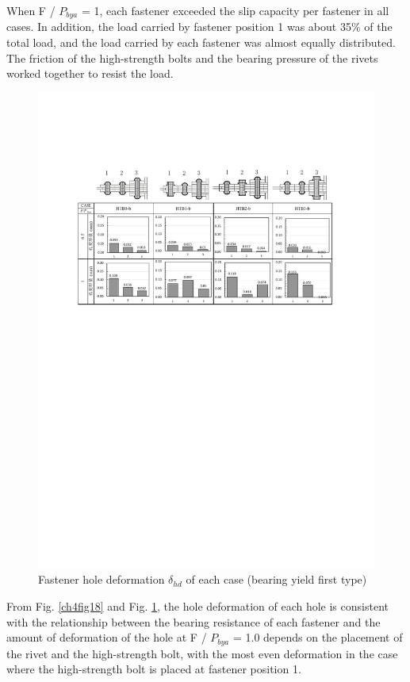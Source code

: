 When F / $P_{bya}$  = 1, each fastener exceeded the slip capacity per fastener in all cases. In addition, the load carried by fastener position 1 was about 35\% of the total load, and the load carried by each fastener was almost equally distributed. The friction of the high-strength bolts and the bearing pressure of the rivets worked together to resist the load.

\begin{figure}
    \centering
    \includegraphics[width=\textwidth]{imgs/ch4/fig19.pdf}
    \caption{Fastener hole deformation $\delta_{hd}$ of each case (bearing yield first type)}
    \label{ch4fig19}
\end{figure}

From Fig. \ref{ch4fig18} and Fig. \ref{ch4fig19}, the hole deformation of each hole is consistent with the relationship between the bearing resistance of each fastener and the amount of deformation of the hole at F / $P_{bya}$  = 1.0 depends on the placement of the rivet and the high-strength bolt, with the most even deformation in the case where the high-strength bolt is placed at fastener position 1.

